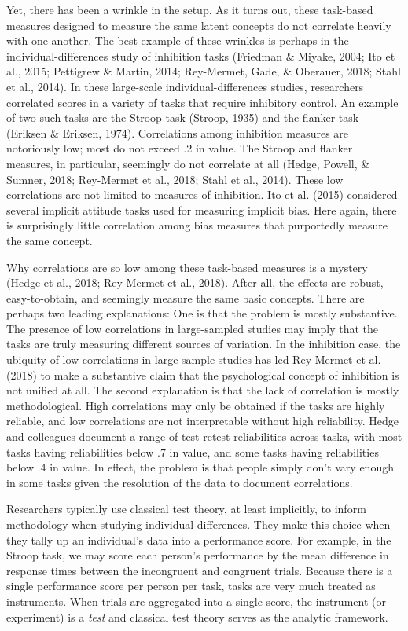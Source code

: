 \documentclass[english,man]{apa6}
\theoremstyle{definition}
\theoremstyle{definition}
\theoremstyle{definition}
\theoremstyle{remark}
\begin{document}
Yet, there has been a wrinkle in the setup. As it turns out, these
task-based measures designed to measure the same latent concepts do not
correlate heavily with one another. The best example of these wrinkles
is perhaps in the individual-differences study of inhibition tasks
(Friedman \& Miyake, 2004; Ito et al., 2015; Pettigrew \& Martin, 2014;
Rey-Mermet, Gade, \& Oberauer, 2018; Stahl et al., 2014). In these
large-scale individual-differences studies, researchers correlated
scores in a variety of tasks that require inhibitory control. An example
of two such tasks are the Stroop task (Stroop, 1935) and the flanker
task (Eriksen \& Eriksen, 1974). Correlations among inhibition measures
are notoriously low; most do not exceed .2 in value. The Stroop and
flanker measures, in particular, seemingly do not correlate at all
(Hedge, Powell, \& Sumner, 2018; Rey-Mermet et al., 2018; Stahl et al.,
2014). These low correlations are not limited to measures of inhibition.
Ito et al. (2015) considered several implicit attitude tasks used for
measuring implicit bias. Here again, there is surprisingly little
correlation among bias measures that purportedly measure the same
concept.

Why correlations are so low among these task-based measures is a mystery
(Hedge et al., 2018; Rey-Mermet et al., 2018). After all, the effects
are robust, easy-to-obtain, and seemingly measure the same basic
concepts. There are perhaps two leading explanations: One is that the
problem is mostly substantive. The presence of low correlations in
large-sampled studies may imply that the tasks are truly measuring
different sources of variation. In the inhibition case, the ubiquity of
low correlations in large-sample studies has led Rey-Mermet et al.
(2018) to make a substantive claim that the psychological concept of
inhibition is not unified at all. The second explanation is that the
lack of correlation is mostly methodological. High correlations may only
be obtained if the tasks are highly reliable, and low correlations are
not interpretable without high reliability. Hedge and colleagues
document a range of test-retest reliabilities across tasks, with most
tasks having reliabilities below .7 in value, and some tasks having
reliabilities below .4 in value. In effect, the problem is that people
simply don't vary enough in some tasks given the resolution of the data
to document correlations.

Researchers typically use classical test theory, at least implicitly, to
inform methodology when studying individual differences. They make this
choice when they tally up an individual's data into a performance score.
For example, in the Stroop task, we may score each person's performance
by the mean difference in response times between the incongruent and
congruent trials. Because there is a single performance score per person
per task, tasks are very much treated as instruments. When trials are
aggregated into a single score, the instrument (or experiment) is a
\emph{test} and classical test theory serves as the analytic framework.
\end{document}
